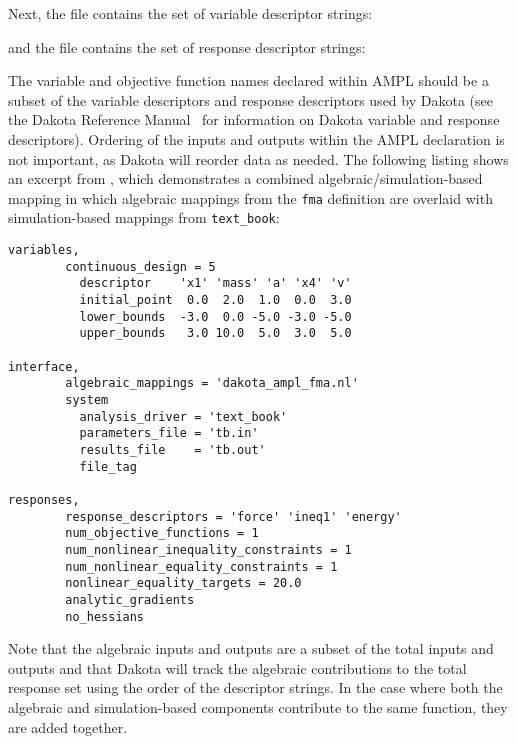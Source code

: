 Next, the  file contains the set of variable
descriptor strings:
\begin{center}
\begin{bigbox}
\begin{small}
\end{small}
\end{bigbox}
\end{center}

and the  file contains the set of response descriptor
strings:
\begin{center}
\begin{bigbox}
\begin{small}
\end{small}
\end{bigbox}
\end{center}

The variable and objective function names declared within AMPL should
be a subset of the variable descriptors and response descriptors used
by Dakota (see the Dakota Reference Manual~\cite{RefMan} for information
on Dakota variable and response descriptors).  Ordering of the inputs
and outputs within the AMPL declaration is not important, as Dakota
will reorder data as needed.  The following listing shows an excerpt
from , which demonstrates a
combined algebraic/simulation-based mapping in which algebraic
mappings from the \texttt{fma} definition are overlaid with
simulation-based mappings from \texttt{text\_book}:
\begin{center}
\begin{bigbox}
\begin{small}
\begin{verbatim}
variables,
        continuous_design = 5
          descriptor    'x1' 'mass' 'a' 'x4' 'v'
          initial_point  0.0  2.0  1.0  0.0  3.0
          lower_bounds  -3.0  0.0 -5.0 -3.0 -5.0
          upper_bounds   3.0 10.0  5.0  3.0  5.0

interface,
        algebraic_mappings = 'dakota_ampl_fma.nl'
        system
          analysis_driver = 'text_book'
          parameters_file = 'tb.in'
          results_file    = 'tb.out'
          file_tag

responses,
        response_descriptors = 'force' 'ineq1' 'energy'
        num_objective_functions = 1
        num_nonlinear_inequality_constraints = 1
        num_nonlinear_equality_constraints = 1
        nonlinear_equality_targets = 20.0
        analytic_gradients
        no_hessians
\end{verbatim}
\end{small}
\end{bigbox}
\end{center}
Note that the algebraic inputs and outputs are a subset of the total
inputs and outputs and that Dakota will track the algebraic
contributions to the total response set using the order of the
descriptor strings.  In the case where both the algebraic and
simulation-based components contribute to the same function, they are
added together.

